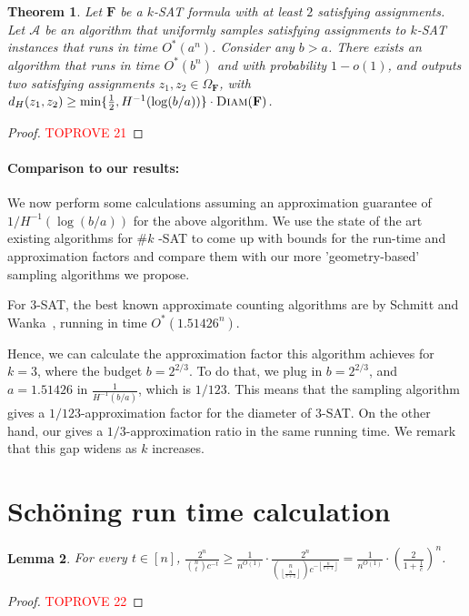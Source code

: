 \documentclass[11pt, letterpaper]{article}
\newtheorem{theorem}{Theorem}
\newtheorem{lemma}[theorem]{Lemma}
\theoremstyle{definition}
\newcommand{\alg}{\mathcal{A}}
\newcommand{\f}{\mathbf{F}}
\newcommand{\Om}{\Omega_{\f}}
\newcommand{\D}{\textsc{Diam}}
\newcommand{\sch}{Sch\"{o}ning\xspace}
\newcommand{\floor}[1]{{\left\lfloor{#1}\right\rfloor}}
\begin{document}
\begin{theorem}
    Let $\f$ be a $k$-SAT formula with at least $2$ satisfying assignments. Let $\alg$ be an algorithm that uniformly samples satisfying assignments to $k$-SAT instances that runs in time $O^*(a^n)$. Consider any $b > a$. There exists an algorithm that runs in time $O^*(b^n)$ and with probability $1-o(1)$, and outputs two satisfying assignments $z_1, z_2 \in \Om$, with $d_H(z_1, z_2) \geq \min\{ \frac{1}{2}, H^{-1}(\log(b/a)) \} \cdot \D(\f)$.
\end{theorem}

\begin{proof}\textcolor{red}{TOPROVE 21}\end{proof}

\paragraph{Comparison to our results:} We now perform some calculations assuming an approximation guarantee of $1/H^{-1}(\log(b/a))$ for the above algorithm. We use the state of the art existing algorithms for $ \#k $ -SAT to come up with bounds for the run-time and approximation factors and compare them with our more 'geometry-based' sampling algorithms we propose. 

For $3$-SAT, the best known approximate counting algorithms are by Schmitt and Wanka~\cite{schmitt2013exploiting}, running in time $O^*(1.51426^n)$. 

Hence, we can calculate the approximation factor this algorithm achieves for $k=3$, where the budget $b=2^{2/3}$. To do that, we plug in $b=2^{2/3}$, and $a=1.51426$ in $\frac{1}{H^{-1}(b/a)}$, which is $1/123$. This means that the sampling algorithm gives a $1/123$-approximation factor for the diameter of $3$-SAT. On the other hand, our  gives a $1/3$-approximation ratio in the same running time. We remark that this gap widens as $k$ increases. 


 \section{\sch run time calculation} \label{schcalc}
\begin{lemma} \label{lem:binommax}
    For every $t \in [n]$, $\frac{2^n}{\binom{n}{t} c^{-t}} \geq \frac{1}{n^{O(1)}} \cdot \frac{2^n}{ \binom{n }{ \floor{\frac{n}{c+1}} } c^{-\floor{\frac{n}{c+1}}}} = \frac{1}{n^{O(1)}}\cdot \left(\frac{2}{1+\frac{1}{c}}\right)^n$.
\end{lemma}
\begin{proof}\textcolor{red}{TOPROVE 22}\end{proof} 
\end{document}
